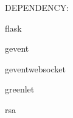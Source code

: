 D\-E\-P\-E\-N\-D\-E\-N\-C\-Y\-:
\begin{DoxyItemize}
\item flask
\item gevent
\item geventwebsocket
\item greenlet
\item rsa 
\end{DoxyItemize}